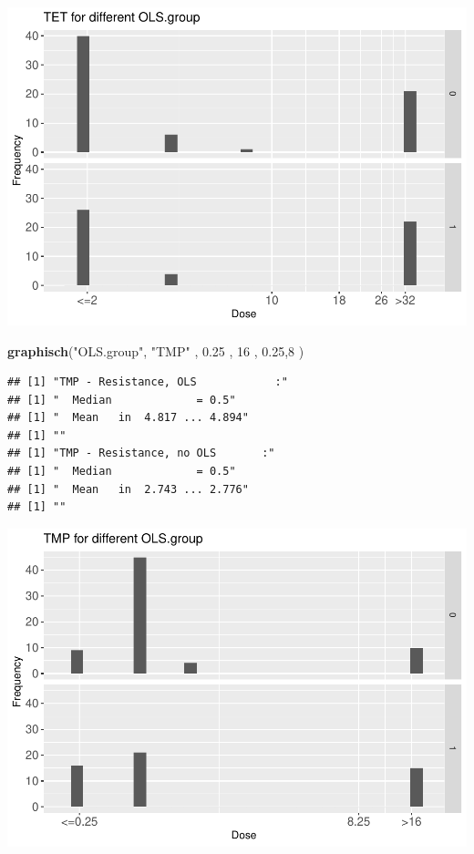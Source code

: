 \documentclass[
]{article}
\newenvironment{Shaded}{\begin{snugshade}}{\end{snugshade}}
\newcommand{\DecValTok}[1]{\textcolor[rgb]{0.00,0.00,0.81}{#1}}
\newcommand{\FloatTok}[1]{\textcolor[rgb]{0.00,0.00,0.81}{#1}}
\newcommand{\KeywordTok}[1]{\textcolor[rgb]{0.13,0.29,0.53}{\textbf{#1}}}
\newcommand{\NormalTok}[1]{#1}
\newcommand{\StringTok}[1]{\textcolor[rgb]{0.31,0.60,0.02}{#1}}
\begin{document}
\includegraphics{Verteilungen_files/figure-latex/unnamed-chunk-28-1.pdf}

\begin{Shaded}
\begin{Highlighting}[]
  \KeywordTok{graphisch}\NormalTok{(}\StringTok{"OLS.group"}\NormalTok{, }\StringTok{"TMP"}\NormalTok{ , }\FloatTok{0.25}\NormalTok{ ,  }\DecValTok{16}\NormalTok{   ,   }\FloatTok{0.25}\NormalTok{,}\DecValTok{8}\NormalTok{    ) }
\end{Highlighting}
\end{Shaded}

\begin{verbatim}
## [1] "TMP - Resistance, OLS            :"
## [1] "  Median             = 0.5"
## [1] "  Mean   in  4.817 ... 4.894"
## [1] ""
## [1] "TMP - Resistance, no OLS       :"
## [1] "  Median             = 0.5"
## [1] "  Mean   in  2.743 ... 2.776"
## [1] ""
\end{verbatim}

\includegraphics{Verteilungen_files/figure-latex/unnamed-chunk-29-1.pdf}
\end{document}
